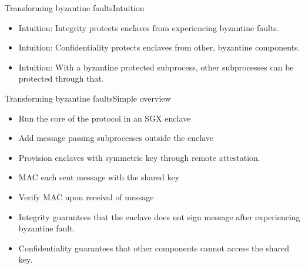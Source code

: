 \documentclass{beamer}
\begin{document}
\begin{frame}{Transforming byzantine faults}{Intuition}
	\begin{itemize}
		\item Intuition: Integrity protects enclaves from experiencing byzantine faults.

  	\vfill

		\item Intuition: Confidentiality protects enclaves from other, byzantine components.

  	\vfill

		\item Intuition: With a byzantine protected subprocess, other subprocesses can be protected through that.

	\end{itemize}
\end{frame}

\begin{frame}{Transforming byzantine faults}{Simple overview}
	\begin{itemize}
		\item Run the core of the protocol in an SGX enclave

  	\vfill

		\item Add message passing subprocesses outside the enclave

  	\vfill

		\item Provision enclaves with symmetric key through remote attestation.

  	\vfill

		\item MAC each sent message with the shared key

  	\vfill

		\item Verify MAC upon receival of message

  	\vfill

		\item Integrity guarantees that the enclave does not sign message after experiencing byzantine fault.

  	\vfill

  	\item Confidentiality guarantees that other components cannot access the shared key.

	\end{itemize}
\end{frame}
\end{document}
